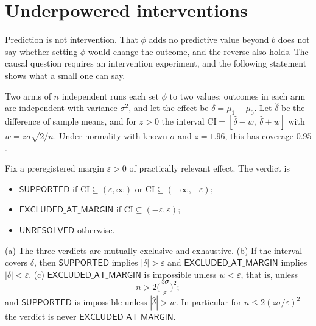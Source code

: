 \section{Underpowered interventions}

Prediction is not intervention. That $\phi$ adds no predictive value beyond $b$ does not say whether setting $\phi$ would change the outcome, and the reverse also holds. The causal question requires an intervention experiment, and the following statement shows what a small one can say.

\begin{definition}
\label{def:two-arm}
Two arms of $n$ independent runs each set $\phi$ to two values; outcomes in each arm are independent with variance $\sigma^2$, and let the effect be $\delta=\mu_1-\mu_0$. Let $\widehat\delta$ be the difference of sample means, and for $z>0$ the interval $\mathrm{CI}=[\widehat\delta-w,\ \widehat\delta+w]$ with $w=z\sigma\sqrt{2/n}$. Under normality with known $\sigma$ and $z=1.96$, this has coverage $0.95$.
\end{definition}

\begin{definition}
\label{def:three-effect}
Fix a preregistered margin $\varepsilon>0$ of practically relevant effect. The verdict is
\begin{itemize}[nosep]
\item $\textsf{SUPPORTED}$ if $\mathrm{CI}\subseteq(\varepsilon,\infty)$ or $\mathrm{CI}\subseteq(-\infty,-\varepsilon)$;
\item $\textsf{EXCLUDED\_AT\_MARGIN}$ if $\mathrm{CI}\subseteq(-\varepsilon,\varepsilon)$;
\item $\textsf{UNRESOLVED}$ otherwise.
\end{itemize}
\end{definition}

\begin{theorem}
\label{thm:power}
(a) The three verdicts are mutually exclusive and exhaustive. (b) If the interval covers $\delta$, then $\textsf{SUPPORTED}$ implies $|\delta|>\varepsilon$ and $\textsf{EXCLUDED\_AT\_MARGIN}$ implies $|\delta|<\varepsilon$. (c) $\textsf{EXCLUDED\_AT\_MARGIN}$ is impossible unless $w<\varepsilon$, that is, unless
\[
n>2\Big(\frac{z\sigma}{\varepsilon}\Big)^2;
\]
and $\textsf{SUPPORTED}$ is impossible unless $|\widehat\delta|>w$. In particular for $n\le2(z\sigma/\varepsilon)^2$ the verdict is never $\textsf{EXCLUDED\_AT\_MARGIN}$.
\end{theorem}


